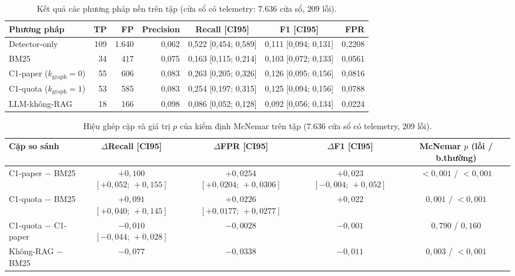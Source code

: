 \begin{table}[htbp]
  \centering
  \caption[So sánh các phương pháp nền trên tập val]{Kết quả các phương pháp nền trên tập  (cửa sổ có telemetry: $7.636$ cửa sổ, $209$ lỗi).}
  \label{tab:ch5-val-h0}
  \scriptsize
  \renewcommand{\arraystretch}{1.15}
  \setlength{\tabcolsep}{3.5pt}
  \begin{tabularx}{\linewidth}{@{}Y r r r c c r@{}}
    \toprule
    \textbf{Phương pháp} & \textbf{TP} & \textbf{FP} & \textbf{Precision} & \textbf{Recall [CI95]} & \textbf{F1 [CI95]} & \textbf{FPR} \\
    \midrule
    Detector-only & 109 & 1.640 & 0,062 & 0,522 [0,454; 0,589] & 0,111 [0,094; 0,131] & 0,2208 \\
    BM25 & 34 & 417 & 0,075 & 0,163 [0,115; 0,214] & 0,103 [0,072; 0,133] & 0,0561 \\
    C1-paper ($k_{\text{graph}} = 0$) & 55 & 606 & 0,083 & 0,263 [0,205; 0,326] & 0,126 [0,095; 0,156] & 0,0816 \\
    C1-quota ($k_{\text{graph}} = 1$) & 53 & 585 & 0,083 & 0,254 [0,197; 0,315] & 0,125 [0,094; 0,156] & 0,0788 \\
    LLM-không-RAG & 18 & 166 & 0,098 & 0,086 [0,052; 0,128] & 0,092 [0,056; 0,134] & 0,0224 \\
    \bottomrule
  \end{tabularx}
\end{table}

\begin{table}[htbp]
  \centering
  \caption[Hiệu ghép cặp và kiểm định McNemar cho H0 trên tập val]{Hiệu ghép cặp và giá trị $p$ của kiểm định McNemar trên tập  ($7.636$ cửa sổ có telemetry, $209$ lỗi).}
  \label{tab:ch5-val-h0-diff}
  \scriptsize
  \renewcommand{\arraystretch}{1.15}
  \setlength{\tabcolsep}{3.5pt}
  \begin{tabularx}{\linewidth}{@{}Y c c c c@{}}
    \toprule
    \textbf{Cặp so sánh} & \textbf{$\Delta$Recall [CI95]} & \textbf{$\Delta$FPR [CI95]} & \textbf{$\Delta$F1 [CI95]} & \textbf{McNemar $p$ (lỗi / b.thường)} \\
    \midrule
    C1-paper $-$ BM25 & $+0{,}100$ $[+0{,}052;\, +0{,}155]$ & $+0{,}0254$ $[+0{,}0204;\, +0{,}0306]$ & $+0{,}023$ $[-0{,}004;\, +0{,}052]$ & $< 0{,}001$ / $< 0{,}001$ \\
    C1-quota $-$ BM25 & $+0{,}091$ $[+0{,}040;\, +0{,}145]$ & $+0{,}0226$ $[+0{,}0177;\, +0{,}0277]$ & $+0{,}022$ & $0{,}001$ / $< 0{,}001$ \\
    C1-quota $-$ C1-paper & $-0{,}010$ $[-0{,}044;\, +0{,}028]$ & $-0{,}0028$ & $-0{,}001$ & $0{,}790$ / $0{,}160$ \\
    Không-RAG $-$ BM25 & $-0{,}077$ & $-0{,}0338$ & $-0{,}011$ & $0{,}003$ / $< 0{,}001$ \\
    \bottomrule
  \end{tabularx}
\end{table}

